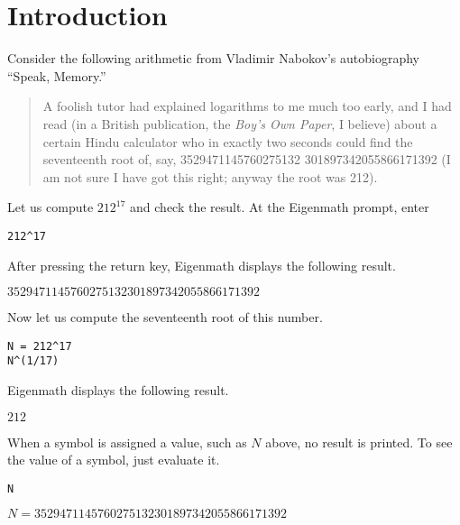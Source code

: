 \section{Introduction}

\noindent
Consider the following arithmetic from Vladimir Nabokov's autobiography ``Speak, Memory.''

\begin{quote}
A foolish tutor had explained logarithms to me much too early, and I had
read (in a British publication, the {\it Boy's Own Paper}, I believe)
about a certain Hindu calculator who in exactly two seconds could find the
seventeenth root of, say,
3529471145760275132 301897342055866171392
(I am not sure I have got this right; anyway the root was 212).
\end{quote}

\noindent
Let us compute $212^{17}$ and check the result.
At the Eigenmath prompt, enter

{\color{blue}
\begin{verbatim}
212^17
\end{verbatim}
}

\noindent
After pressing the return key, Eigenmath displays the following result.

\bigskip
\noindent
$3529471145760275132301897342055866171392$

\bigskip
\noindent
Now let us compute the seventeenth root of this number.

{\color{blue}
\begin{verbatim}
N = 212^17
N^(1/17)
\end{verbatim}
}

\noindent
Eigenmath displays the following result.

\bigskip
\noindent
$212$

\bigskip
\noindent
When a symbol is assigned a value, such as $N$ above, no result is printed.
To see the value of a symbol, just evaluate it.

{\color{blue}
\begin{verbatim}
N
\end{verbatim}
}

\noindent
$N=3529471145760275132301897342055866171392$
